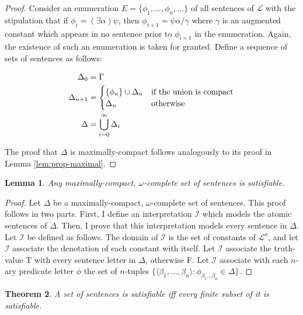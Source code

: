 \documentclass[12pt]{article}
\newtheorem{theorem}{Theorem}[section]
\newtheorem{lemma}[theorem]{Lemma}
\theoremstyle{definition}
\theoremstyle{remark}
\begin{document}
\begin{proof}
	Consider an enumeration $E = \{ \phi_1, ..., \phi_n, ... \}$ of all sentences of $\mathscr{L}$ with the stipulation that if $\phi_i=(\exists \alpha)\psi$, then $\phi_{i+1}=\psi\alpha/\gamma$ where $\gamma$ is an augmented constant which appears in no sentence prior to $\phi_{i+1}$ in the enumeration. Again, the existence of such an enumeration is taken for granted. Define a sequence of sets of sentences as follows:
	
	\begin{align*}
	\Delta_0 &= \Gamma \\
	\Delta_{n+1} &= \begin{cases}
	\{ \phi_n \} \cup \Delta_n & \textnormal{if the union is compact} \\
	\Delta_n & \textnormal{otherwise}
	\end{cases}\\
	\Delta &= \bigcup_{i=0}^\infty \Delta_i
	\end{align*}
	
	The proof that $\Delta$ is maximally-compact follows analogously to its proof in Lemma \ref{lem:prop-maximal}.
	
	
\end{proof}

\begin{lemma}
	\label{lem:pred-sat}
	Any maximally-compact, $\omega$-complete set of sentences is satisfiable.
\end{lemma}

\begin{proof}
	Let $\Delta$ be a maximally-compact, $\omega$-complete set of sentences. This proof follows in two parts. First, I define an interpretation $\mathscr{I}$ which models the atomic sentences of $\Delta$. Then, I prove that this interpretation models every sentence in $\Delta$. Let $\mathscr{I}$ be defined as follows. The domain of $\mathscr{I}$ is the set of constants of $\mathscr{L}^a$, and let $\mathscr{I}$ associate the denotation of each constant with itself. Let $\mathscr{I}$ associate the truth-value T with every sentence letter in $\Delta$, otherwise F. Let $\mathscr{I}$ associate with each $n$-ary predicate letter $\phi$ the set of $n$-tuples $\{ \langle \beta_1, ..., \beta_n \rangle : \phi_{\beta_1 ... \beta_n} \in \Delta \}$.
\end{proof}

\begin{theorem}
	A set of sentences is satisfiable iff every finite subset of it is satisfiable.
\end{theorem}
\end{document}
